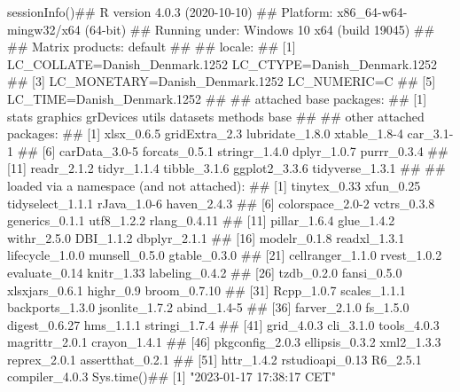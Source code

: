\documentclass{article}\usepackage[]{graphicx}\usepackage[]{color}
\begin{document}
sessionInfo()## R version 4.0.3 (2020-10-10)
## Platform: x86_64-w64-mingw32/x64 (64-bit)
## Running under: Windows 10 x64 (build 19045)
## 
## Matrix products: default
## 
## locale:
## [1] LC_COLLATE=Danish_Denmark.1252  LC_CTYPE=Danish_Denmark.1252   
## [3] LC_MONETARY=Danish_Denmark.1252 LC_NUMERIC=C                   
## [5] LC_TIME=Danish_Denmark.1252    
## 
## attached base packages:
## [1] stats     graphics  grDevices utils     datasets  methods   base     
## 
## other attached packages:
##  [1] xlsx_0.6.5      gridExtra_2.3   lubridate_1.8.0 xtable_1.8-4    car_3.1-1      
##  [6] carData_3.0-5   forcats_0.5.1   stringr_1.4.0   dplyr_1.0.7     purrr_0.3.4    
## [11] readr_2.1.2     tidyr_1.1.4     tibble_3.1.6    ggplot2_3.3.6   tidyverse_1.3.1
## 
## loaded via a namespace (and not attached):
##  [1] tinytex_0.33     xfun_0.25        tidyselect_1.1.1 rJava_1.0-6      haven_2.4.3     
##  [6] colorspace_2.0-2 vctrs_0.3.8      generics_0.1.1   utf8_1.2.2       rlang_0.4.11    
## [11] pillar_1.6.4     glue_1.4.2       withr_2.5.0      DBI_1.1.2        dbplyr_2.1.1    
## [16] modelr_0.1.8     readxl_1.3.1     lifecycle_1.0.0  munsell_0.5.0    gtable_0.3.0    
## [21] cellranger_1.1.0 rvest_1.0.2      evaluate_0.14    knitr_1.33       labeling_0.4.2  
## [26] tzdb_0.2.0       fansi_0.5.0      xlsxjars_0.6.1   highr_0.9        broom_0.7.10    
## [31] Rcpp_1.0.7       scales_1.1.1     backports_1.3.0  jsonlite_1.7.2   abind_1.4-5     
## [36] farver_2.1.0     fs_1.5.0         digest_0.6.27    hms_1.1.1        stringi_1.7.4   
## [41] grid_4.0.3       cli_3.1.0        tools_4.0.3      magrittr_2.0.1   crayon_1.4.1    
## [46] pkgconfig_2.0.3  ellipsis_0.3.2   xml2_1.3.3       reprex_2.0.1     assertthat_0.2.1
## [51] httr_1.4.2       rstudioapi_0.13  R6_2.5.1         compiler_4.0.3
Sys.time()## [1] "2023-01-17 17:38:17 CET"
\end{document}
